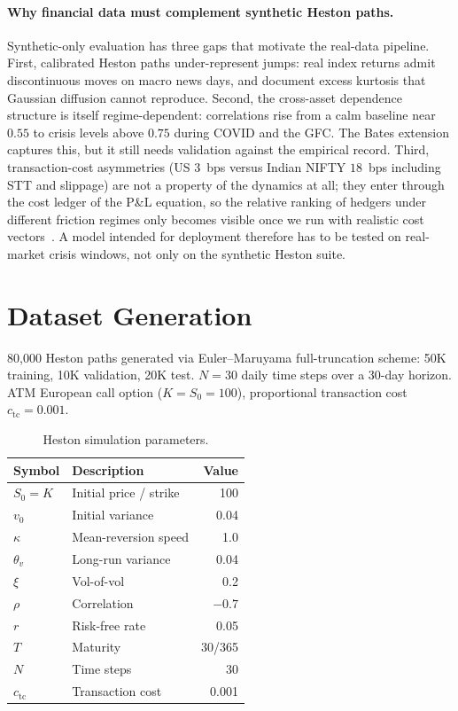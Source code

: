 \documentclass[11pt,oneside]{report}
\begin{document}
\paragraph{Why financial data must complement synthetic Heston paths.}\label{sec:why_real_data}
Synthetic-only evaluation has three gaps that motivate the real-data pipeline. First, calibrated Heston paths under-represent jumps: real index returns admit discontinuous moves on macro news days, and \citet{cont2001empirical} document excess kurtosis that Gaussian diffusion cannot reproduce. Second, the cross-asset dependence structure is itself regime-dependent: correlations rise from a calm baseline near $0.55$ to crisis levels above $0.75$ during COVID and the GFC. The Bates extension captures this, but it still needs validation against the empirical record. Third, transaction-cost asymmetries (US $3$~bps versus Indian NIFTY $18$~bps including STT and slippage) are not a property of the dynamics at all; they enter through the cost ledger of the P\&L equation, so the relative ranking of hedgers under different friction regimes only becomes visible once we run with realistic cost vectors~\citep{leland1985option,whalley1997asymptotic}. A model intended for deployment therefore has to be tested on real-market crisis windows, not only on the synthetic Heston suite.

\section{Dataset Generation}

80,000 Heston paths generated via Euler--Maruyama full-truncation scheme: 50K training, 10K validation, 20K test. $N = 30$ daily time steps over a 30-day horizon. ATM European call option ($K = S_0 = 100$), proportional transaction cost $c_{\mathrm{tc}} = 0.001$.

\begin{table}[H]
\centering\small
\caption{Heston simulation parameters.}
\label{tab:heston_params_setup}
\begin{tabular}{@{}llr@{}}
\toprule
\textbf{Symbol} & \textbf{Description} & \textbf{Value} \\\midrule
$S_0 = K$ & Initial price / strike & 100 \\
$v_0$ & Initial variance & 0.04 \\
$\kappa$ & Mean-reversion speed & 1.0 \\
$\theta_v$ & Long-run variance & 0.04 \\
$\xi$ & Vol-of-vol & 0.2 \\
$\rho$ & Correlation & $-0.7$ \\
$r$ & Risk-free rate & 0.05 \\
$T$ & Maturity & 30/365 \\
$N$ & Time steps & 30 \\
$c_{\mathrm{tc}}$ & Transaction cost & 0.001 \\
\bottomrule
\end{tabular}
\end{table}
\end{document}
